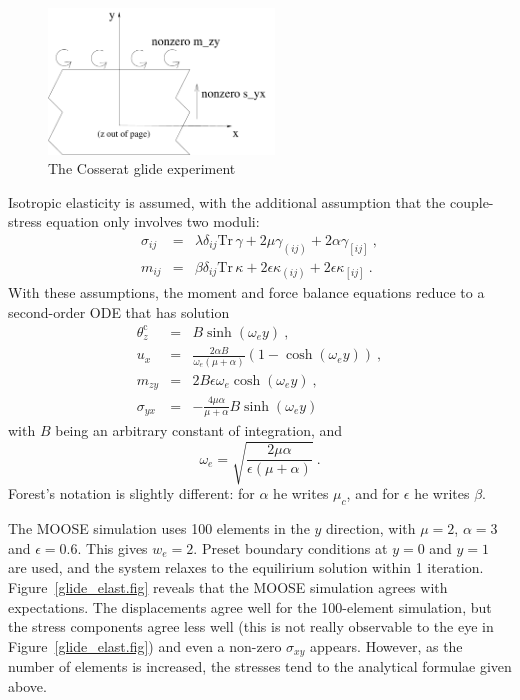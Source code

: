 \documentclass[]{scrreprt}
\newcommand{\si}{\sigma}
\newcommand{\thetac}{\theta^{\mathrm{c}}}
\newcommand{\ep}{\epsilon}
\newcommand{\ga}{\gamma}
\newcommand{\non}{\nonumber}
\newcommand{\de}{\delta}
\newcommand{\ka}{\kappa}
\newcommand{\la}{\lambda}
\newcommand{\tr}{\mbox{Tr}\,}
\newcommand{\al}{\alpha}
\newcommand{\be}{\beta}
\begin{document}
\begin{figure}[htb]
\begin{center}
\includegraphics[width=6cm]{glide_fig.pdf}
\caption{The Cosserat glide experiment}
\label{glide.fig}
\end{center}
\end{figure}

Isotropic elasticity is assumed, with the additional assumption that
the couple-stress equation only involves two moduli:
\begin{eqnarray}
\si_{ij} & = & \la\de_{ij}\tr\ga + 2\mu\ga_{(ij)} + 2\al\ga_{[ij]} \ ,
\non \\
m_{ij} & = & \be\de_{ij}\tr\ka + 2\ep\ka_{(ij)} + 2\ep\ka_{[ij]} \ .
\end{eqnarray}
With these assumptions, the moment and force balance equations reduce
to a second-order ODE that has solution
\begin{eqnarray}
\thetac_{z} & = & B\sinh(\omega_{e}y) \ , \\
u_{x} & = & \frac{2 \al B}{\omega_{e}(\mu + \al)}(1 -
\cosh(\omega_{e}y)) \ , \\
m_{zy} & = & 2B\epsilon \omega_{e}\cosh(\omega_{e}y) \ , \\
\sigma_{yx} & = & -\frac{4\mu\al}{\mu + \al}B\sinh(\omega_{e}y)
\end{eqnarray}
with $B$ being an arbitrary constant of integration, and
\begin{equation}
\omega_{e} = \sqrt{\frac{2\mu\al}{\epsilon(\mu + \al)}} \ .
\end{equation}
Forest's notation is slightly different: for $\al$ he writes $\mu_{c}$,
and for $\epsilon$ he writes $\beta$.

The MOOSE simulation uses 100 elements in the $y$ direction, with
$\mu=2$, $\al=3$ and $\epsilon=0.6$.  This gives $w_{e}=2$.  Preset
boundary conditions at $y=0$ and $y=1$ are used, and the system
relaxes to the equilirium solution within 1 iteration.
Figure~\ref{glide_elast.fig} reveals that the MOOSE simulation agrees
with expectations.  The displacements agree well for the 100-element
simulation, but the stress components agree less well (this is not
really observable to the eye in Figure~\ref{glide_elast.fig}) and even a
non-zero $\sigma_{xy}$ appears.  However, as the number of elements
is increased, the stresses tend to the analytical formulae given above.
\end{document}
